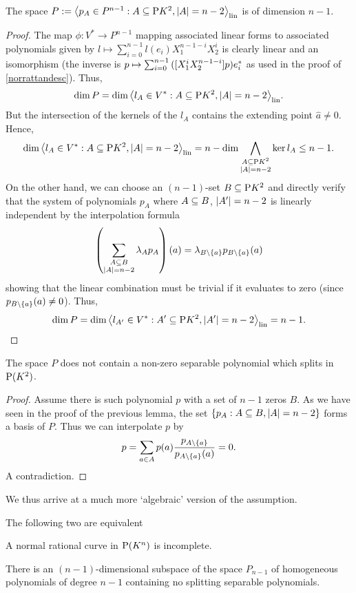 \begin{lemma}
    The space $P:=\gen{p_A\in P^{n-1}:A\setleq \proj{K^2},\card A=n-2}_{\lin}$ is of dimension $n-1$.
\end{lemma}

\begin{proof}
    The map $\phi:V^{\ast}\to P^{n-1}$ mapping associated linear forms to associated polynomials given by $l\mapsto \sum_{i=0}^{n-1}{l(e_i)X_1^{n-1-i}X_2^i}$ is clearly linear and an isomorphism (the inverse is $p\mapsto\sum_{i=0}^{n-1}{([X_1^i X_2^{n-1-i}]p){e}^{\ast}_i}$ as used in the proof of \autoref{norrattandesc}). Thus,
    $$
\dim{P}=\dim\gen[\lin]{l_A\in V^{\ast}:A\setleq \proj{K^2},\card A=n-2}.
$$
But the intersection of the kernels of the $l_A$ contains the extending point $\hat{a}\neq 0$. Hence, 
$$
\dim\gen[\lin]{l_A\in V^{\ast}:A\setleq \proj{K^2},\card A=n-2}=n-\dim\Meet_{\substack{A\setleq\proj{K^2}\\ \card A=n-2}}{\ker{l_A}}\leq n-1.
$$
On the other hand, we can choose an $(n-1)$-set $B\subseteq \mathrm{P}{K^2}$ and directly verify that the system of polynomials $p_A$ where $A\subseteq B$, $\left|A'\right|=n-2$ is linearly independent by the interpolation formula
$$
\left(\sum_{\substack{A\setleq B\\ \card{A}=n-2}}{\lambda_A p_A}\right)(a)=\lambda_{B\setminus\set{a}}p_{B\setminus\set{a}}(a)
$$
showing that the linear combination must be trivial if it evaluates to zero (since $p_{B\setminus\set{a}}(a)\neq 0$).
Thus,
$$
\dim{P}=\dim\gen[\lin]{l_{A'}\in V^{\ast}:A'\setleq \proj{K^2},\card{A'}=n-2}=n-1.
$$
\end{proof}

\begin{lemma}
    The space $P$ does not contain a non-zero separable polynomial which splits in $\mathrm{P}(K^2)$.
\end{lemma}

\begin{proof}
    Assume there is such polynomial $p$ with a set of $n-1$ zeros $B$.
    As we have seen in the proof of the previous lemma, the set $\set{p_A:A\setleq B,\card A=n-2}$ forms a basis of $P$. Thus we can interpolate $p$ by
    $$
    p=\sum_{a\in A}{p(a)\frac{p_{A\setminus\set{a}}}{p_{A\setminus\set{a}}(a)}}=0.
    $$
    A contradiction.
\end{proof}

We thus arrive at a much more `algebraic' version of the assumption. 

\begin{lemma}\label{char-incomp-nor-rat-curve}
    The following two are equivalent
    \begin{statements}
            \item A normal rational curve in $\mathrm{P} (K^n)$ is incomplete.\label{norrat-incomp}
            \item There is an $(n-1)$-dimensional subspace of the space $P_{n-1}$ of homogeneous polynomials of degree $n-1$ containing no splitting separable polynomials.\label{subspace-without-sep-spl-poly}
    \end{statements}
\end{lemma}

